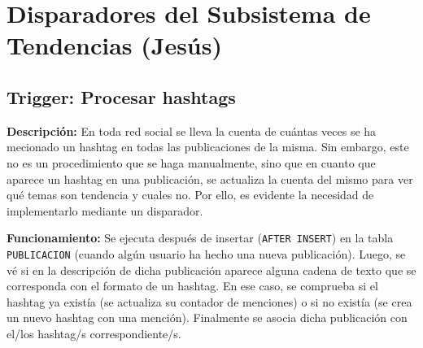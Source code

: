 \section{Disparadores del Subsistema de Tendencias (Jesús)}


\subsection{Trigger: Procesar hashtags}

\textbf{Descripción:} En toda red social se lleva la cuenta de cuántas veces se ha mecionado un hashtag en todas las publicaciones de la misma. Sin embargo, este no es un procedimiento que se haga manualmente, sino que en cuanto que aparece un hashtag en una publicación, se actualiza la cuenta del mismo para ver qué temas son tendencia y cuales no. Por ello, es evidente la necesidad de implementarlo mediante un disparador.

\textbf{Funcionamiento:} Se ejecuta después de insertar (\texttt{AFTER INSERT}) en la tabla \texttt{PUBLICACION} (cuando algún usuario ha hecho una nueva publicación). Luego, se vé si en la descripción de dicha publicación aparece alguna cadena de texto que se corresponda con el formato de un hashtag. En ese caso, se comprueba si el hashtag ya existía (se actualiza su contador de menciones) o si no existía (se crea un nuevo hashtag con una mención). Finalmente se asocia dicha publicación con el/los hashtag/s correspondiente/s. 

